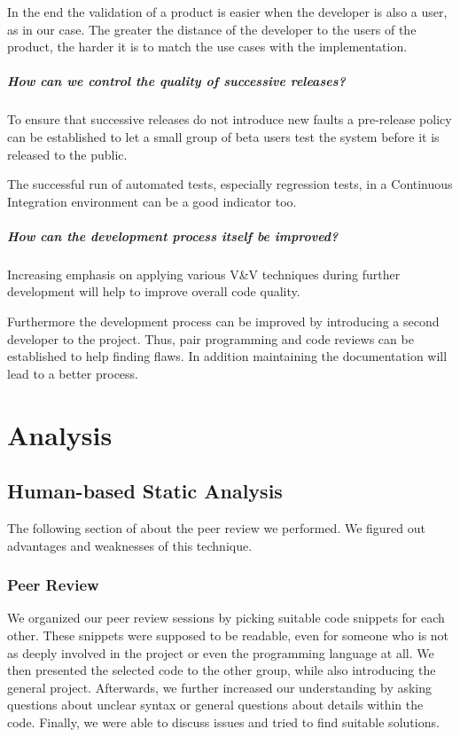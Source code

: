 \documentclass{scrreprt}
\begin{document}
In the end the validation of a product is easier when the developer is also a user, as in our case. The greater the distance of the developer to the users of the product, the harder it is to match the use cases with the implementation. 

\paragraph{How can we control the quality of successive releases?}

To ensure that successive releases do not introduce new faults a pre-release policy can be established to let a small group of beta users test the system before it is released to the public.

The successful run of automated tests, especially regression tests, in a Continuous Integration environment can be a good indicator too.

\paragraph{How can the development process itself be improved?}

Increasing emphasis on applying various V\&V techniques during further development will help to improve overall code quality. 

Furthermore the development process can be improved by introducing a second developer to the project. Thus, pair programming and code reviews can be established to help finding flaws. In addition maintaining the documentation will lead to a better process.


\chapter{Analysis}

\section{Human-based Static Analysis}

The following section of about the peer review we performed. We figured out advantages and weaknesses of this technique.

\subsection{Peer Review}
\label{subsec:peer_review}

We organized our peer review sessions by picking suitable code snippets for each other. These snippets were supposed to be readable, even for someone who is not as deeply involved in the project or even the programming language at all. We then presented the selected code to the other group, while also introducing the general project. Afterwards, we further increased our understanding by asking questions about unclear syntax or general questions about details within the code. Finally, we were able to discuss issues and tried to find suitable solutions.
\end{document}
